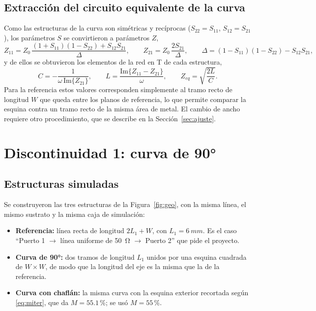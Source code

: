 \documentclass[11pt,letterpaper]{article}
\begin{document}
\subsection{Extracción del circuito equivalente de la curva}
\label{sec:extraccion}
Como las estructuras de la curva son simétricas y recíprocas ($S_{22}=S_{11}$, $S_{12}=S_{21}$), los parámetros $S$ se convirtieron a parámetros $Z$,
\begin{equation}
Z_{11} = Z_0\,\frac{(1+S_{11})(1-S_{22})+S_{12}S_{21}}{\Delta}, \qquad
Z_{21} = Z_0\,\frac{2S_{21}}{\Delta}, \qquad
\Delta = (1-S_{11})(1-S_{22})-S_{12}S_{21},
\label{eq:zparam}
\end{equation}
y de ellos se obtuvieron los elementos de la red en T de cada estructura,
\begin{equation}
C = -\frac{1}{\omega\,\mathrm{Im}\{Z_{21}\}}, \qquad
L = \frac{\mathrm{Im}\{Z_{11}-Z_{21}\}}{\omega}, \qquad
Z_{eq} = \sqrt{\frac{2L}{C}}.
\label{eq:LC}
\end{equation}
Para la referencia estos valores corresponden simplemente al tramo recto de longitud $W$ que queda entre los planos de referencia, lo que permite comparar la esquina contra un tramo recto de la misma área de metal. El cambio de ancho requiere otro procedimiento, que se describe en la Sección~\ref{sec:ajuste}.

\section{Discontinuidad 1: curva de \ang{90}}
\label{sec:d1}

\subsection{Estructuras simuladas}
Se construyeron las tres estructuras de la Figura~\ref{fig:geo}, con la misma línea, el mismo sustrato y la misma caja de simulación:
\begin{itemize}
\item \textbf{Referencia:} línea recta de longitud $2L_1+W$, con $L_1=\SI{6}{mm}$. Es el caso ``Puerto 1 $\rightarrow$ línea uniforme de \SI{50}{\ohm} $\rightarrow$ Puerto 2'' que pide el proyecto.
\item \textbf{Curva de \ang{90}:} dos tramos de longitud $L_1$ unidos por una esquina cuadrada de $W\times W$, de modo que la longitud del eje es la misma que la de la referencia.
\item \textbf{Curva con chaflán:} la misma curva con la esquina exterior recortada según \eqref{eq:miter}, que da $M=55.1\,\%$; se usó $M=55\,\%$.
\end{itemize}
\end{document}
